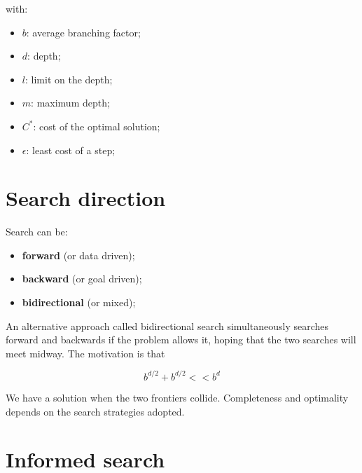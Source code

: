 \documentclass{article}
\begin{document}
\begin{flushleft}
    with:
\end{flushleft}
\begin{itemize}
    \item $b$: average branching factor;
    \item $d$: depth;
    \item $l$: limit on the depth;
    \item $m$: maximum depth;
    \item $C^*$: cost of the optimal solution;
    \item $\epsilon$: least cost of a step; 
\end{itemize}

\newpage

\section{Search direction}

Search can be:

\begin{itemize}
    \item \textbf{forward} (or data driven);
    \item \textbf{backward} (or goal driven);
    \item \textbf{bidirectional} (or mixed);
\end{itemize}

An alternative approach called bidirectional search simultaneously searches forward and backwards if the problem allows it, hoping that the two searches will meet midway. The motivation is that

\begin{equation}
    b^{d/2} + b^{d/2} << b^d
\end{equation}

\begin{flushleft}
    We have a solution when the two frontiers collide. Completeness and optimality depends on the search strategies adopted.
\end{flushleft}

\newpage

\section{Informed search}

\end{document}
